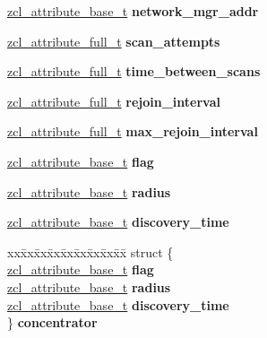 \begin{DoxyCompactItemize}
\item 
\mbox{\label{group__zcl__commissioning_ga0620fad728d084914ccccefbc1e9974e}} 
\hyperlink{structzcl__attribute__base__t}{zcl\+\_\+attribute\+\_\+base\+\_\+t} {\bfseries network\+\_\+mgr\+\_\+addr}
\item 
\mbox{\label{group__zcl__commissioning_ga772def3b0cecf3ab1b43d4552045bf3d}} 
\hyperlink{structzcl__attribute__full__t}{zcl\+\_\+attribute\+\_\+full\+\_\+t} {\bfseries scan\+\_\+attempts}
\item 
\mbox{\label{group__zcl__commissioning_gab77bda9402b3baf69f0e53071b5092c9}} 
\hyperlink{structzcl__attribute__full__t}{zcl\+\_\+attribute\+\_\+full\+\_\+t} {\bfseries time\+\_\+between\+\_\+scans}
\item 
\mbox{\label{group__zcl__commissioning_ga4a3fa877d693ce16ec96d411c006c931}} 
\hyperlink{structzcl__attribute__full__t}{zcl\+\_\+attribute\+\_\+full\+\_\+t} {\bfseries rejoin\+\_\+interval}
\item 
\mbox{\label{group__zcl__commissioning_gabafd1511eb2355fe4a362ddfd9239603}} 
\hyperlink{structzcl__attribute__full__t}{zcl\+\_\+attribute\+\_\+full\+\_\+t} {\bfseries max\+\_\+rejoin\+\_\+interval}
\item 
\hyperlink{structzcl__attribute__base__t}{zcl\+\_\+attribute\+\_\+base\+\_\+t} {\bfseries flag}
\item 
\hyperlink{structzcl__attribute__base__t}{zcl\+\_\+attribute\+\_\+base\+\_\+t} {\bfseries radius}
\item 
\hyperlink{structzcl__attribute__base__t}{zcl\+\_\+attribute\+\_\+base\+\_\+t} {\bfseries discovery\+\_\+time}
\item 
\mbox{\label{group__zcl__commissioning_ga9f96e6854cf32be9ba0cdf83f0beda4d}} 
\begin{tabbing}
xx\=xx\=xx\=xx\=xx\=xx\=xx\=xx\=xx\=\kill
struct \{\\
\>\hyperlink{structzcl__attribute__base__t}{zcl\_attribute\_base\_t} {\bfseries flag}\\
\>\hyperlink{structzcl__attribute__base__t}{zcl\_attribute\_base\_t} {\bfseries radius}\\
\>\hyperlink{structzcl__attribute__base__t}{zcl\_attribute\_base\_t} {\bfseries discovery\_time}\\
\} {\bfseries concentrator}\\


\end{tabbing}
\end{DoxyCompactItemize}
